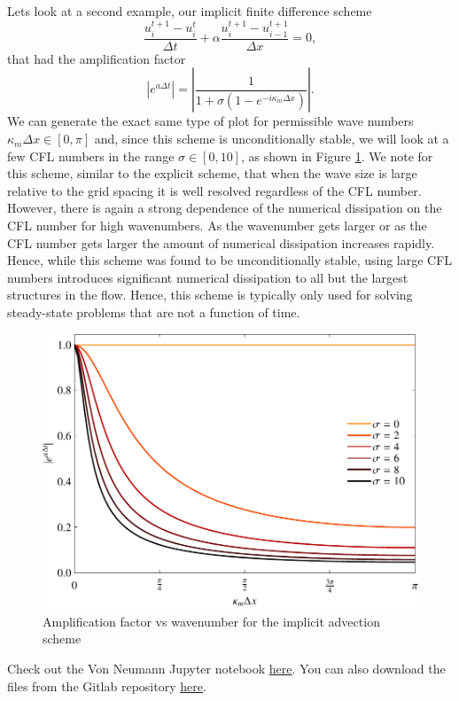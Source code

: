 Lets look at a second example, our implicit finite difference scheme
\begin{equation}
	\frac{u_i^{t+1} - u_{i}^t}{\Delta t} +  \alpha \frac{u_i^{t+1} - u_{i-1}^{t+1}}{\Delta x} = 0,
\end{equation}
that had the amplification factor
\begin{equation}
	|e^{a\Delta t}| = \left| \frac{1}{1 + \sigma \left( 1 - e^{-i \kappa_m \Delta x} \right)} \right|.
\end{equation}
We can generate the exact same type of plot for permissible wave numbers $\kappa_m \Delta x \in [0,\pi]$ and, since this scheme is unconditionally stable, we will look at a few CFL numbers in the range $\sigma \in [0,10]$, as shown in Figure \ref{fig:dissipation_advection_implicit}. We note for this scheme, similar to the explicit scheme, that when the wave size is large relative to the grid spacing it is well resolved regardless of the CFL number. However, there is again a strong dependence of the numerical dissipation on the CFL number for high wavenumbers. As the wavenumber gets larger or as the CFL number gets larger the amount of numerical dissipation increases rapidly. Hence, while this scheme was found to be unconditionally stable, using large CFL numbers introduces significant numerical dissipation to all but the largest structures in the flow. Hence, this scheme is typically only used for solving steady-state problems that are not a function of time.
\begin{figure}[htbp]
	\centering
	\includegraphics[width=0.6\linewidth]{Pictures/dissipation_adv_implct}
	\caption{Amplification factor vs wavenumber for the implicit advection scheme}
	\label{fig:dissipation_advection_implicit}
\end{figure}
\begin{jupyternote}
	Check out the Von Neumann Jupyter notebook \href{\binderurl}{\underline{here}}. You can also download the files from the Gitlab repository \href{\repourl}{\underline{here}}.
\end{jupyternote}
